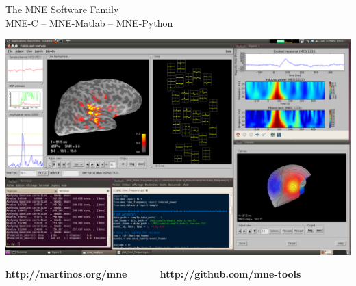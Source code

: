 \documentclass[t,11pt,compress]{beamer} %
\begin{document}
\begin{frame}[plain,t,c]
\begin{minipage}[B]{0.47\linewidth}
\end{minipage}%
%
\hfill%
\begin{minipage}{.5\linewidth}
    \Large\bfseries
    \begin{minipage}{\linewidth}
        \centering
        The MNE Software Family\\
    MNE-C -- MNE-Matlab -- MNE-Python
    \begin{center}
        \includegraphics[width=\linewidth]{mne-screenshot-montage.png}%
    \end{center}
    \end{minipage}
\end{minipage}

\begin{minipage}{\linewidth}
    \smallskip
\center
{\huge\bfseries\sffamily http://martinos.org/mne~~~~~~http://github.com/mne-tools}
\end{minipage}


\end{frame}
\end{document}
